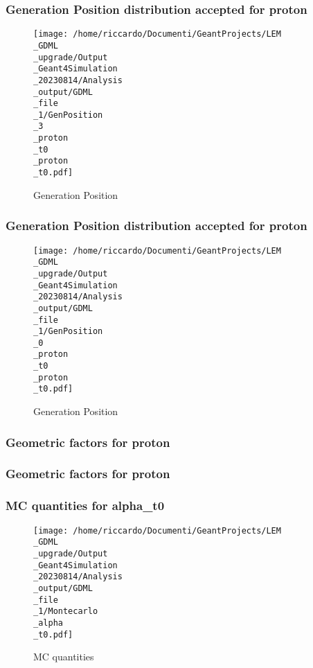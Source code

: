 \documentclass[8pt]{beamer}
\begin{document}
            \begin{frame}
                \frametitle{Generation Position distribution accepted for proton}
            
        \begin{figure}[h]
            \centering
            \texttt{[image: /home/riccardo/Documenti/GeantProjects/LEM\\\_GDML\\\_upgrade/Output\\\_Geant4Simulation\\\_20230814/Analysis\\\_output/GDML\\\_file\\\_1/GenPosition\\\_3\\\_proton\\\_t0\\\_proton\\\_t0.pdf]}
            \caption{Generation Position}
        \end{figure}
        
            \end{frame}
            
            \begin{frame}
                \frametitle{Generation Position distribution accepted for proton}
            
        \begin{figure}[h]
            \centering
            \texttt{[image: /home/riccardo/Documenti/GeantProjects/LEM\\\_GDML\\\_upgrade/Output\\\_Geant4Simulation\\\_20230814/Analysis\\\_output/GDML\\\_file\\\_1/GenPosition\\\_0\\\_proton\\\_t0\\\_proton\\\_t0.pdf]}
            \caption{Generation Position}
        \end{figure}
        
            \end{frame}
            
            \begin{frame}
                \frametitle{Geometric factors for proton}
            
            \end{frame}
            
            \begin{frame}
                \frametitle{Geometric factors for proton}
            
            \end{frame}
            
            \begin{frame}
                \frametitle{MC quantities for alpha\_t0}
            
        \begin{figure}[h]
            \centering
            \texttt{[image: /home/riccardo/Documenti/GeantProjects/LEM\\\_GDML\\\_upgrade/Output\\\_Geant4Simulation\\\_20230814/Analysis\\\_output/GDML\\\_file\\\_1/Montecarlo\\\_alpha\\\_t0.pdf]}
            \caption{MC quantities}
        \end{figure}
        
            \end{frame}
            
\end{document}
